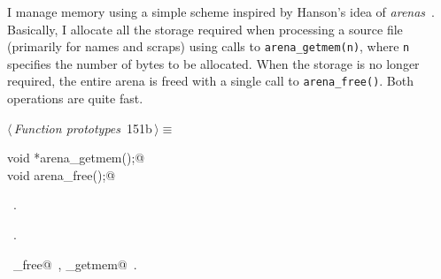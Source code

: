 \documentclass[a4paper]{report}
\begin{document}
I manage memory using a simple scheme inspired by Hanson's idea of
{\em arenas\/}~\cite{hanson:90}.
Basically, I allocate all the storage required when processing a
source file (primarily for names and scraps) using calls to
\verb|arena_getmem(n)|, where \verb|n| specifies the number of bytes to
be allocated. When the storage is no longer required, the entire arena
is freed with a single call to  \verb|arena_free()|. Both operations
are quite fast.
\begin{flushleft} \small
\begin{minipage}{\linewidth}\label{scrap337}\raggedright\small
{} $\langle\,${\it Function prototypes}\nobreak\ {\footnotesize {151b}}$\,\rangle\equiv$
\vspace{-1ex}
\begin{list}{}{} \item
\mbox{}\verb@extern void *arena_getmem();@\\
\mbox{}\verb@extern void arena_free();@\\
\mbox{}\verb@@{\NWsep}
\end{list}
\vspace{-1.5ex}
\footnotesize
\begin{list}{}{\setlength{\itemsep}{-\parsep}\setlength{\itemindent}{-\leftmargin}}
\item \NWtxtMacroDefBy\ .
\item \NWtxtMacroRefIn\ .
\item \NWtxtIdentsUsed\nobreak\  \verb@arena_free@\nobreak\ , \verb@arena_getmem@\nobreak\ .
\item{}
\end{list}
\end{minipage}\vspace{4ex}
\end{flushleft}
\end{document}
